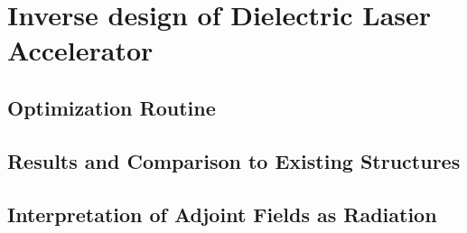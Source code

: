 \section{Inverse design of Dielectric Laser Accelerator}

\subsection{Optimization Routine}

\subsection{Results and Comparison to Existing Structures}

\subsection{Interpretation of Adjoint Fields as Radiation}
